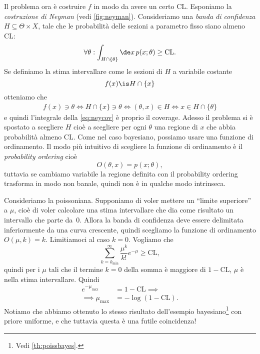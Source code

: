 Il problema ora è costruire $f$ in modo da avere un certo $\mathrm{CL}$.
Esponiamo la \emph{costruzione di Neyman} (vedi \autoref{fig:neyman}).
Consideriamo una \emph{banda di confidenza} $H\subseteq \Theta\times X$,
tale che le probabilità delle sezioni a parametro fisso siano almeno $\mathrm{CL}$:
\begin{equation}
	\label{eq:neycov}
	\forall\theta:
	\int_{H\cap \{\theta\}} \de x\, p(x;\theta) \ge \mathrm{CL}.
\end{equation}
Se definiamo la stima intervallare come le sezioni di $H$ a variabile costante
\begin{equation*}
	f(x) \is H \cap \{x\}
\end{equation*}
otteniamo che
\begin{align*}
	f(x)\ni\theta
	\iff
	H \cap \{x\} \ni \theta
	\iff
	(\theta,x) \in H
	\iff
	x \in H \cap \{\theta\}
\end{align*}
e quindi l'integrale della \eqref{eq:neycov} è proprio il coverage.
Adesso il problema si è spostato a scegliere $H$
cioè a scegliere per ogni $\theta$ una regione di $x$ che abbia probabilità almeno $\mathrm{CL}$.
Come nel caso bayesiano, possiamo usare una funzione di ordinamento.
Il modo più intuitivo di scegliere la funzione di ordinamento è il \emph{probability ordering} cioè
\begin{equation*}
	O(\theta,x) = p(x;\theta),
\end{equation*}
tuttavia se cambiamo variabile la regione definita con il probability ordering trasforma in modo non banale,
quindi non è in qualche modo intrinseca.

\begin{example}
	\label{th:poisssup}
	Consideriamo la poissoniana.
	Supponiamo di voler mettere un ``limite superiore'' a $\mu$,
	cioè di voler calcolare una stima intervallare che dia come risultato un intervallo che parte da~0.
	Allora la banda di confidenza deve essere delimitata inferiormente da una curva crescente,
	quindi scegliamo la funzione di ordinamento $O(\mu,k)=k$.
	Limitiamoci al caso $k=0$.
	Vogliamo che
	\begin{equation*}
		\sum_{k=k_\mathrm{min}}^\infty \frac{\mu^k}{k!}e^{-\mu} \ge \mathrm{CL},
	\end{equation*}
	quindi per i $\mu$ tali che il termine $k=0$ della somma è maggiore di $1-\mathrm{CL}$,
	$\mu$ è nella stima intervallare.
	Quindi
	\begin{align*}
		e^{-\mu_\mathrm{max}}
		&= 1 - \mathrm{CL} \implies \\
		\implies \mu_\mathrm{\max}
		&= -\log(1-\mathrm{CL}).
	\end{align*}
	Notiamo che abbiamo ottenuto lo stesso risultato dell'esempio bayesiano\footnote{Vedi \autoref{th:poissbayes}.} con priore uniforme,
	e che tuttavia questa è una futile coincidenza!
\end{example}

